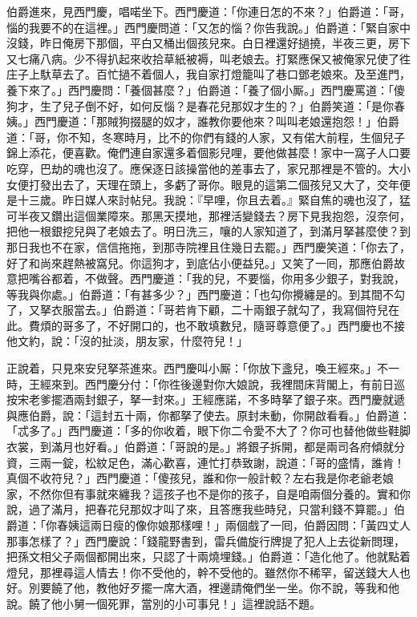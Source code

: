伯爵進來，見西門慶，唱喏坐下。西門慶道：「你連日怎的不來？」伯爵道：「哥，惱的我要不的在這裡。」西門慶問道：「又怎的惱？你告我說。」伯爵道：「緊自家中沒錢，昨日俺房下那個，平白又桶出個孩兒來。白日裡還好撾撓，半夜三更，房下又七痛八病。少不得扒起來收拾草紙被褥，叫老娘去。打緊應保又被俺家兄使了徃庄子上馱草去了。百忙撾不着個人，我自家打燈籠叫了巷口鄧老娘來。及至進門，養下來了。」西門慶問：「養個甚麼？」伯爵道：「養了個小厮。」西門慶罵道：「傻狗才，生了兒子倒不好，如何反惱？是春花兒那奴才生的？」伯爵笑道：「是你春姨。」西門慶道：「那賊狗掇腿的奴才，誰教你要他來？叫叫老娘還抱怨！」伯爵道：「哥，你不知，冬寒時月，比不的你們有錢的人家，又有偌大前程，生個兒子錦上添花，便喜歡。俺們連自家還多着個影兒哩，要他做甚麼！家中一窩子人口要吃穿，巴劫的魂也沒了。應保逐日該操當他的差事去了，家兄那裡是不管的。大小女便打發出去了，天理在頭上，多虧了哥你。{}眼見的這第二個孩兒又大了，交年便是十三歲。昨日媒人來討帖兒。我說：『早哩，你且去着。』緊自焦的魂也沒了，猛可半夜又鑽出這個業障來。那黑天摸地，那裡活變錢去？房下見我抱怨，沒奈何，把他一根銀挖兒與了老娘去了。{}明日洗三，嚷的人家知道了，到滿月拏甚麼使？到那日我也不在家，信信拖拖，到那寺院裡且住幾日去罷。」{}西門慶笑道：「你去了，好了和尚來趕熱被窩兒。你這狗才，到底佔小便益兒。」又笑了一囘，那應伯爵故意把嘴谷都着，{}不做聲。{}西門慶道：「我的兒，不要惱，你用多少銀子，對我說，等我與你處。」伯爵道：「有甚多少？」西門慶道：「也勾你攪纏是的。到其間不勾了，又拏衣服當去。」伯爵道：「哥若肯下顧，二十兩銀子就勾了，我寫個符兒在此。費煩的哥多了，不好開口的，也不敢填數兒，隨哥尊意便了。」西門慶也不接他文約，說：「沒的扯淡，朋友家，什麼符兒！」

正說着，只見來安兒拏茶進來。西門慶叫小厮：「你放下盞兒，喚王經來。」不一時，王經來到。西門慶分付：「你徃後邊對你大娘說，我裡間床背閣上，有前日巡按宋老爹擺酒兩封銀子，拏一封來。」王經應諾，不多時拏了銀子來。西門慶就遞與應伯爵，說：「這封五十兩，你都拏了使去。{}原封未動，你開啟看看。」伯爵道：「忒多了。」西門慶道：「多的你收着，眼下你二令愛不大了？你可也替他做些鞋脚衣裳，到滿月也好看。」伯爵道：「哥說的是。」將銀子拆開，都是兩司各府傾就分資，三兩一錠，松紋足色，滿心歡喜，連忙打恭致謝，說道：「哥的盛情，誰肯！真個不收符兒？」西門慶道：「傻孩兒，誰和你一般計較？左右我是你老爺老娘家，不然你但有事就來纏我？這孩子也不是你的孩子，自是咱兩個分養的。實和你說，過了滿月，把春花兒那奴才叫了來，且答應我些時兒，只當利錢不算罷。」伯爵道：「你春姨這兩日瘦的像你娘那樣哩！」兩個戲了一囘，伯爵因問：「黃四丈人那事怎樣了？」西門慶說：「錢龍野書到，雷兵備旋行牌提了犯人上去從新問理，把孫文相父子兩個都開出來，只認了十兩燒埋錢。」伯爵道：「造化他了。他就點着燈兒，那裡尋這人情去！你不受他的，幹不受他的。雖然你不稀罕，留送錢大人也好。別要饒了他，教他好歹擺一席大酒，裡邊請俺們坐一坐。你不說，等我和他說。饒了他小舅一個死罪，當別的小可事兒！」這裡說話不題。

